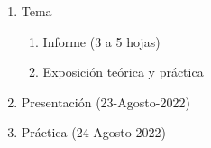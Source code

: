 \documentclass[xcolor=dvipsnames,envcountsect]{beamer}
\begin{document}
\begin{frame}[allowframebreaks]
\begin{enumerate}
\begin{enumerate}
				\item Tema
					\begin{enumerate}
					\item Informe (3 a 5 hojas)
					\item Exposición teórica y práctica 
					\end{enumerate}
				\item Presentación (23-Agosto-2022) 
				\item Práctica (24-Agosto-2022)
				\end{enumerate}
		\end{enumerate}

			
		
		
\end{frame}








\end{document}
